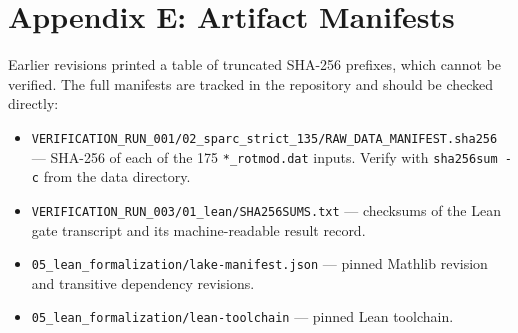 \section*{Appendix E: Artifact Manifests}
\label{app:artifact_manifest}

Earlier revisions printed a table of truncated SHA-256 prefixes, which cannot be verified. The
full manifests are tracked in the repository and should be checked directly:

\begin{itemize}\raggedright
  \item \texttt{VERIFICATION\_RUN\_001/02\_sparc\_strict\_135/RAW\_DATA\_MANIFEST.sha256} ---
        SHA-256 of each of the 175 \texttt{*\_rotmod.dat} inputs. Verify with
        \texttt{sha256sum -c} from the data directory.
  \item \texttt{VERIFICATION\_RUN\_003/01\_lean/SHA256SUMS.txt} --- checksums of the Lean gate
        transcript and its machine-readable result record.
  \item \texttt{05\_lean\_formalization/lake-manifest.json} --- pinned Mathlib revision and
        transitive dependency revisions.
  \item \texttt{05\_lean\_formalization/lean-toolchain} --- pinned Lean toolchain.
\end{itemize}
